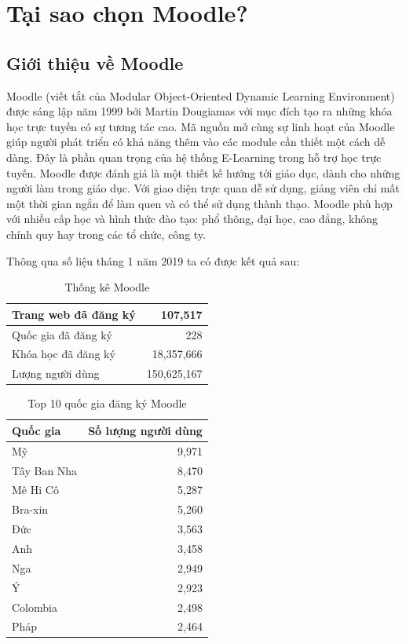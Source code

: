 \section{Tại sao chọn Moodle?}
\subsection{Giới thiệu về Moodle }
{Moodle \cite{aboutmoodle} (viết tắt của Modular Object-Oriented Dynamic Learning Environment) được sáng lập năm 1999 bởi Martin Dougiamas với mục đích tạo ra những khóa học trực tuyến có sự tương tác cao. Mã nguồn mở cùng sự linh hoạt của Moodle giúp người phát triển có khả năng thêm vào các module cần thiết một cách dễ dàng. Đây là phần quan trọng của hệ thống E-Learning trong hỗ trợ học trực tuyến. Moodle được đánh giá là một thiết kế hướng tới giáo dục, dành cho những người làm trong giáo dục. Với giao diện trực quan dễ sử dụng, giảng viên chỉ mất một thời gian ngắn để làm quen và có thể sử dụng thành thạo. Moodle phù hợp với nhiều cấp học và hình thức đào tạo: phổ thông, đại học, cao đẳng, không chính quy hay trong các tổ chức, công ty.}


{Thông qua số liệu tháng 1 năm 2019 \cite{moodlestats} ta có được kết quả sau:}
\begin{center}
	\begin{table}[!htp]
		\centering
		\begin{tabular}{|l|r|}
			\hline 
			Trang web đã đăng ký & 107,517 \\ 
			\hline 
			Quốc gia đã đăng ký & 228 \\ 
			\hline 
			Khóa học đã đăng ký & 18,357,666 \\ 
			\hline 
			Lượng người dùng & 150,625,167 \\ 
			\hline 
		\end{tabular} 
		\caption{Thống kê Moodle}
		\label{bang1}
	\end{table}
\end{center}
\begin{center}
	\begin{table}[!htp]
		\centering
		\begin{tabular}{|l|r|}
			\hline 
			{\bf Quốc gia} & {\bf Số lượng người dùng} \\ 
			\hline 
			Mỹ & 9,971 \\ 
			\hline 
			Tây Ban Nha & 8,470 \\ 
			\hline 
			Mê Hi Cô & 5,287 \\ 
			\hline 
			Bra-xin & 5,260 \\ 
			\hline 
			Đức & 3,563 \\ 
			\hline 
			Anh & 3,458 \\ 
			\hline 
			Nga & 2,949 \\ 
			\hline 
			Ý & 2,923 \\ 
			\hline 
			Colombia & 2,498 \\ 
			\hline 
			Pháp & 2,464 \\ 
			\hline 
		\end{tabular} 
		\caption{Top 10 quốc gia đăng ký Moodle}
		\label{bang3}
	\end{table}
\end{center}

